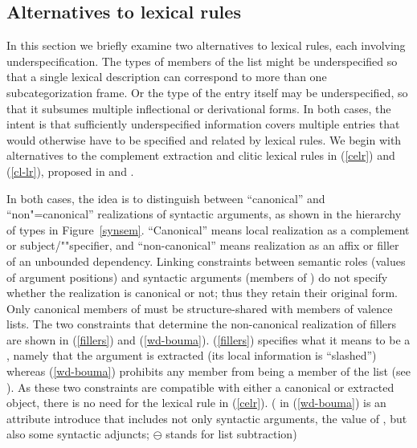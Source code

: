 \documentclass[output=paper,biblatex,babelshorthands,newtxmath,draftmode,colorlinks,citecolor=brown]{langscibook}
\begin{document}
\subsection{Alternatives to lexical rules}
\label{sec:alt}

In this section we briefly examine two alternatives to lexical rules, each involving underspecification. The types of members of the  list might be underspecified so that a single lexical description can correspond to more than one subcategorization frame. Or the type of the entry itself may be underspecified, so that it subsumes multiple inflectional or derivational forms. In both cases, the intent is that sufficiently underspecified information covers multiple entries that would otherwise have to be specified and related by lexical rules. We begin with alternatives to the complement extraction and clitic lexical rules in (\ref{celr}) and (\ref{cl-lr}), proposed in  and .%

In both cases, the idea is to distinguish between ``canonical'' and ``non"=canonical'' realizations of syntactic arguments, as shown in the hierarchy of  types in Figure~\ref{synsem}. ``Canonical'' means local realization as a complement or subject/""specifier, and ``non-canonical'' means realization as an affix or filler of an unbounded dependency. Linking constraints between semantic roles (values of argument positions) and syntactic arguments (members of ) do not specify whether the realization is canonical or not; thus they retain their original form. Only canonical members of  must be structure-shared with members of valence lists. The two constraints that determine the non-canonical realization of fillers are shown in (\ref{fillers}) and (\ref{wd-bouma}). (\ref{fillers}) specifies what it means to be a , namely that the argument is extracted (its local information is ``slashed'') whereas (\ref{wd-bouma}) prohibits any  member from being a member of the  list (see \citealt[23]{Boumaetal2001}). As these two constraints are compatible with either a canonical or extracted object, there is no need for the lexical rule in (\ref{celr}). ( in (\ref{wd-bouma}) is an attribute \citeauthor{Boumaetal2001} introduce that includes not only syntactic arguments, the value of , but also some syntactic adjuncts; $\ominus$ stands for list subtraction)
\end{document}
